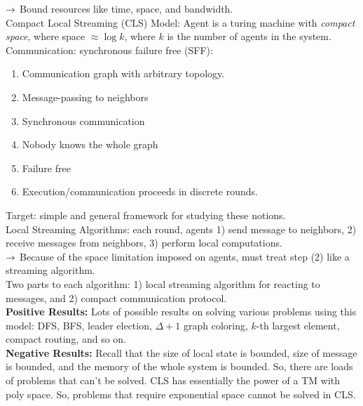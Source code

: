 
$\rightarrow$ Bound resources like time, space, and bandwidth. \\

Compact Local Streaming (CLS) Model: Agent is a turing machine with {\it compact space}, where space $\approx \log k$, where $k$ is the number of agents in the system. \\

Communication: synchronous failure free (SFF):
\begin{enumerate}
    \item Communication graph with arbitrary topology.
    \item Message-passing to neighbors
    \item Synchronous communication
    \item Nobody knows the whole graph
    \item Failure free
    \item Execution/communication proceeds in discrete rounds.
\end{enumerate}

Target: simple and general framework for studying these notions. \\



Local Streaming Algorithms: each round, agents 1) send message to neighbors, 2) receive messages from neighbors, 3) perform local computations. \\

$\rightarrow$ Because of the space limitation imposed on agents, must treat step (2) like a streaming algorithm. \\

Two parts to each algorithm: 1) local streaming algorithm for reacting to messages, and 2) compact communication protocol. \\

{\bf Positive Results:} Lots of possible results on solving various problems using this model: DFS, BFS, leader election, $\Delta+1$ graph coloring, $k$-th largest element, compact routing, and so on. \\

{\bf Negative Results:} Recall that the size of local state is bounded, size of message is bounded, and the memory of the whole system is bounded. So, there are loads of problems that can't be solved. CLS has essentially the power of a TM with poly space. So, problems that require exponential space cannot be solved in CLS. \\

